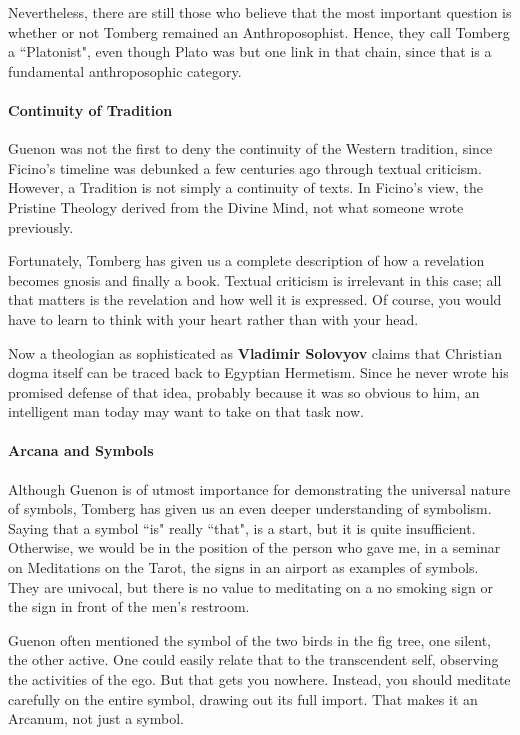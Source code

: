 Nevertheless, there are still those who believe that the most important question is whether or not Tomberg remained an Anthroposophist. Hence, they call Tomberg a ``Platonist", even though Plato was but one link in that chain, since that is a fundamental anthroposophic category.

\paragraph{Continuity of Tradition}
Guenon was not the first to deny the continuity of the Western tradition, since Ficino's timeline was debunked a few centuries ago through textual criticism. However, a Tradition is not simply a continuity of texts. In Ficino's view, the Pristine Theology derived from the Divine Mind, not what someone wrote previously.

Fortunately, Tomberg has given us a complete description of how a revelation becomes gnosis and finally a book. Textual criticism is irrelevant in this case; all that matters is the revelation and how well it is expressed. Of course, you would have to learn to think with your heart rather than with your head.

Now a theologian as sophisticated as \textbf{Vladimir Solovyov} claims that Christian dogma itself can be traced back to Egyptian Hermetism. Since he never wrote his promised defense of that idea, probably because it was so obvious to him, an intelligent man today may want to take on that task now.

\paragraph{Arcana and Symbols}
Although Guenon is of utmost importance for demonstrating the universal nature of symbols, Tomberg has given us an even deeper understanding of symbolism. Saying that a symbol ``is" really ``that", is a start, but it is quite insufficient. Otherwise, we would be in the position of the person who gave me, in a seminar on Meditations on the Tarot, the signs in an airport as examples of symbols. They are univocal, but there is no value to meditating on a no smoking sign or the sign in front of the men's restroom.

Guenon often mentioned the symbol of the two birds in the fig tree, one silent, the other active. One could easily relate that to the transcendent self, observing the activities of the ego. But that gets you nowhere. Instead, you should meditate carefully on the entire symbol, drawing out its full import. That makes it an Arcanum, not just a symbol.

